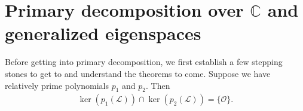 \documentclass{book}
\theoremstyle{definition}
\newcommand{\lag}{\mathcal{L}}
\begin{document}
%
\newpage
\chapter{Primary decomposition over $\mathbb{C}$ and generalized eigenspaces}

Before getting into primary decomposition, we first establish a few stepping stones to get to and understand the theorems to come. Suppose we have relatively prime polynomials $p_1$ and $p_2$. Then
\begin{align*}
\ker(p_1(\lag)) \cap \ker(p_2(\lag)) = \{ \mathcal{O} \}.
\end{align*}
\end{document}
